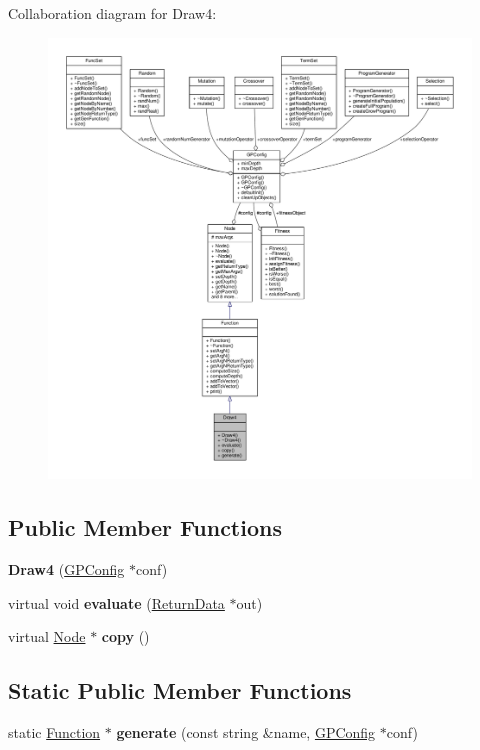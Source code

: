 Collaboration diagram for Draw4\+:
\nopagebreak
\begin{figure}[H]
\begin{center}
\leavevmode
\includegraphics[width=350pt]{classDraw4__coll__graph}
\end{center}
\end{figure}
\subsection*{Public Member Functions}
\begin{DoxyCompactItemize}
\item 
\hypertarget{classDraw4_a30a878a94519eb6c291629927d5edf5d}{}\label{classDraw4_a30a878a94519eb6c291629927d5edf5d} 
{\bfseries Draw4} (\hyperlink{classGPConfig}{G\+P\+Config} $\ast$conf)
\item 
\hypertarget{classDraw4_a2eeefbe82ec2b6fef14e8bd5947c02ac}{}\label{classDraw4_a2eeefbe82ec2b6fef14e8bd5947c02ac} 
virtual void {\bfseries evaluate} (\hyperlink{classReturnData}{Return\+Data} $\ast$out)
\item 
\hypertarget{classDraw4_a6e4128cfa6b2b59dd08eb7e25da03f2e}{}\label{classDraw4_a6e4128cfa6b2b59dd08eb7e25da03f2e} 
virtual \hyperlink{classNode}{Node} $\ast$ {\bfseries copy} ()
\end{DoxyCompactItemize}
\subsection*{Static Public Member Functions}
\begin{DoxyCompactItemize}
\item 
\hypertarget{classDraw4_a125086be4643dd452fc5f952a61f9e83}{}\label{classDraw4_a125086be4643dd452fc5f952a61f9e83} 
static \hyperlink{classFunction}{Function} $\ast$ {\bfseries generate} (const string \&name, \hyperlink{classGPConfig}{G\+P\+Config} $\ast$conf)
\end{DoxyCompactItemize}
